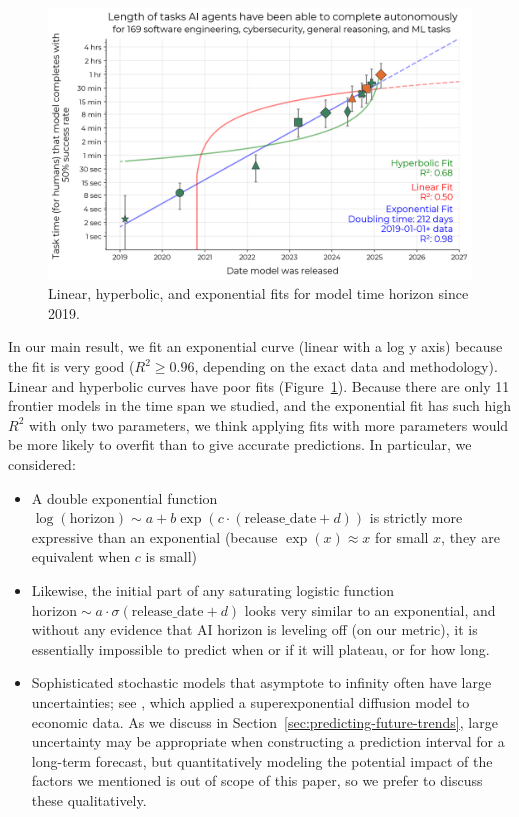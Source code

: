 \documentclass{article}
\newcommand{\numfrontiermodels}{11}
\begin{document}
\begin{figure}
    \centering
    \includegraphics[width=0.7\linewidth]{plots/horizon_alternative_fits.png}
    \caption{Linear, hyperbolic, and exponential fits for model time horizon since 2019.}
    \label{fig:alternative-fits}
\end{figure}

In our main result, we fit an exponential curve (linear with a log y axis) because the fit is very good ($R^2 \ge 0.96$, depending on the exact data and methodology). Linear and hyperbolic curves have poor fits (Figure~\ref{fig:alternative-fits}). Because there are only \numfrontiermodels{} frontier models in the time span we studied, and the exponential fit has such high $R^2$ with only two parameters, we think applying fits with more parameters would be more likely to overfit than to give accurate predictions. In particular, we considered:
\begin{itemize}
    \item A double exponential function $\log(\mathrm{horizon}) \sim a + b \exp(c \cdot (\mathrm{release\_date} + d))$ is strictly more expressive than an exponential (because $\exp(x) \approx x$ for small $x$, they are equivalent when $c$ is small)
    \item Likewise, the initial part of any saturating logistic function $\mathrm{horizon} \sim a \cdot \sigma(\mathrm{release\_date} + d) $ looks very similar to an exponential, and without any evidence that AI horizon is leveling off (on our metric), it is essentially impossible to predict when or if it will plateau, or for how long.
    \item Sophisticated stochastic models that asymptote to infinity often have large uncertainties; see \citet{Roodman2020growthrate}, which applied a superexponential diffusion model to economic data. As we discuss in Section~\ref{sec:predicting-future-trends}, large uncertainty may be appropriate when constructing a prediction interval for a long-term forecast, but quantitatively modeling the potential impact of the factors we mentioned is out of scope of this paper, so we prefer to discuss these qualitatively.
\end{itemize}
\end{document}
